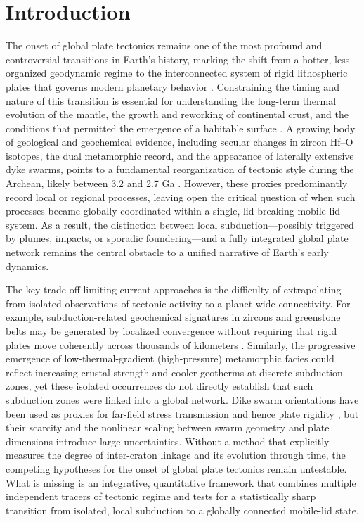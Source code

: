 \documentclass{article}
\begin{document}
\section{Introduction}
The onset of global plate tectonics remains one of the most profound and controversial transitions in Earth’s history, marking the shift from a hotter, less organized geodynamic regime to the interconnected system of rigid lithospheric plates that governs modern planetary behavior \cite{stern2005neoproterozoic,hawkesworth2016geological}. Constraining the timing and nature of this transition is essential for understanding the long-term thermal evolution of the mantle, the growth and reworking of continental crust, and the conditions that permitted the emergence of a habitable surface \cite{kamber2015earlyearth,holder2019metamorphic}. A growing body of geological and geochemical evidence, including secular changes in zircon Hf–O isotopes, the dual metamorphic record, and the appearance of laterally extensive dyke swarms, points to a fundamental reorganization of tectonic style during the Archean, likely between 3.2 and 2.7 Ga \cite{brown2006duality,condie2009episodic,bleeker2006dyke}. However, these proxies predominantly record local or regional processes, leaving open the critical question of when such processes became globally coordinated within a single, lid-breaking mobile-lid system. As a result, the distinction between local subduction—possibly triggered by plumes, impacts, or sporadic foundering—and a fully integrated global plate network remains the central obstacle to a unified narrative of Earth’s early dynamics.

The key trade-off limiting current approaches is the difficulty of extrapolating from isolated observations of tectonic activity to a planet-wide connectivity. For example, subduction-related geochemical signatures in zircons and greenstone belts may be generated by localized convergence without requiring that rigid plates move coherently across thousands of kilometers \cite{hawkesworth2016zircon}. Similarly, the progressive emergence of low-thermal-gradient (high-pressure) metamorphic facies \cite{brown2006duality} could reflect increasing crustal strength and cooler geotherms at discrete subduction zones, yet these isolated occurrences do not directly establish that such subduction zones were linked into a global network. Dike swarm orientations have been used as proxies for far-field stress transmission and hence plate rigidity \cite{davies2019dyke}, but their scarcity and the nonlinear scaling between swarm geometry and plate dimensions introduce large uncertainties. Without a method that explicitly measures the degree of inter-craton linkage and its evolution through time, the competing hypotheses for the onset of global plate tectonics remain untestable. What is missing is an integrative, quantitative framework that combines multiple independent tracers of tectonic regime and tests for a statistically sharp transition from isolated, local subduction to a globally connected mobile-lid state.
\end{document}
